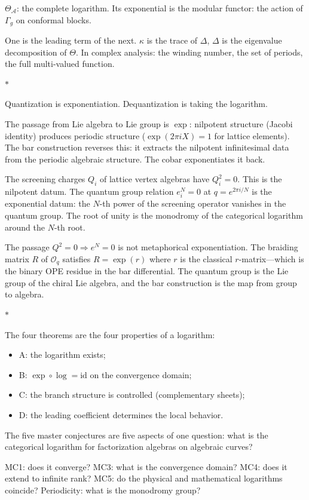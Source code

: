 \documentclass[11pt]{article}
\newcommand{\cA}{\mathcal{A}}
\newcommand{\cO}{\mathcal{O}}
\newcommand{\sep}{\bigskip\begin{center}$*$\end{center}\medskip}
\begin{document}
$\Theta_\cA$: the complete logarithm.  Its exponential is the
modular functor: the action of $\Gamma_g$ on conformal blocks.

One is the leading term of the next.  $\kappa$ is the trace of
$\Delta$, $\Delta$ is the eigenvalue decomposition of $\Theta$.
In complex analysis: the winding number, the set of periods, the
full multi-valued function.

\sep

Quantization is exponentiation.  Dequantization is taking the
logarithm.

The passage from Lie algebra to Lie group is $\exp$: nilpotent
structure (Jacobi identity) produces periodic structure
($\exp(2\pi i X) = 1$ for lattice elements).  The bar construction
reverses this: it extracts the nilpotent infinitesimal data from
the periodic algebraic structure.  The cobar exponentiates it back.

The screening charges $Q_i$ of lattice vertex algebras have
$Q_i^2 = 0$.  This is the nilpotent datum.  The quantum group
relation $e_i^N = 0$ at $q = e^{2\pi i/N}$ is the exponential
datum: the $N$-th power of the screening operator vanishes in
the quantum group.  The root of unity is the monodromy of the
categorical logarithm around the $N$-th root.

The passage $Q^2 = 0 \Rightarrow e^N = 0$ is not metaphorical
exponentiation.  The braiding matrix $R$ of $\cO_q$ satisfies
$R = \exp(r)$ where $r$ is the classical $r$-matrix---which is
the binary OPE residue in the bar differential.  The quantum group
is the Lie group of the chiral Lie algebra, and the bar construction
is the map from group to algebra.

\sep

The four theorems are the four properties of a logarithm:
\begin{itemize}[nosep]
\item A: the logarithm exists;
\item B: $\exp \circ \log = \mathrm{id}$ on the convergence domain;
\item C: the branch structure is controlled (complementary sheets);
\item D: the leading coefficient determines the local behavior.
\end{itemize}

The five master conjectures are five aspects of one question: what
is the categorical logarithm for factorization algebras on algebraic
curves?

MC1: does it converge?  MC3: what is the convergence domain?
MC4: does it extend to infinite rank?  MC5: do the physical and
mathematical logarithms coincide?  Periodicity: what is the
monodromy group?
\end{document}
